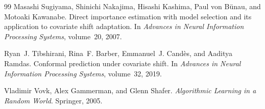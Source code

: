\begin{thebibliography}{99}
Masashi Sugiyama, Shinichi Nakajima, Hisashi Kashima, Paul von B\"unau, and
  Motoaki Kawanabe.
\newblock Direct importance estimation with model selection and its application
  to covariate shift adaptation.
\newblock In \emph{Advances in Neural Information Processing Systems}, volume~20,
  2007.

Ryan~J. Tibshirani, Rina~F. Barber, Emmanuel~J. Cand\`es, and Aaditya Ramdas.
\newblock Conformal prediction under covariate shift.
\newblock In \emph{Advances in Neural Information Processing Systems}, volume~32,
  2019.

Vladimir Vovk, Alex Gammerman, and Glenn Shafer.
\newblock \emph{Algorithmic Learning in a Random World}.
\newblock Springer, 2005.

\end{thebibliography}

\clearpage
\appendix
